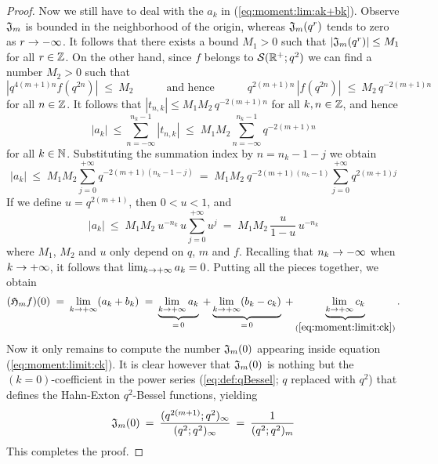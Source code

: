 \begin{proof}
Now we still have to deal with the $a_k$ in (\ref{eq:moment:lim:ak+bk}).
Observe $\mathfrak{J}_{m}$ is bounded in the neighborhood of the origin, whereas
$\mathfrak{J}_{m}(q^r)$ tends to zero as $r \rightarrow -\infty$. It follows
that there exists a bound $M_1>0$ such that $|\mathfrak{J}_{m}(q^r)| \leq M_1$
for all $r \in \mathbb{Z}$. On the other hand, since $f$ belongs to ${\mathcal S}(\mathbb{R}^+;q^2)$
we can find a number $M_2>0$ such that
$$ |q^{4(m+1)n} f(q^{2n})| \; \leq \: M_2
         \hspace{3em} \mbox{and hence} \hspace{3em}
   q^{2(m+1)n} \, |f(q^{2n})| \; \leq \: M_2 \, q^{-2(m+1)n}    $$
for all $n\in \mathbb{Z}$.
It follows that $|t_{n,k}| \leq M_1 M_2\, q^{-2(m+1)n}$ for all $k,n\in \mathbb{Z}$,
and hence
$$ |a_k| \: \leq \sum_{n=-\infty}^{n_k-1} |t_{n,k}|
         \; \leq \; M_1 M_2 \sum_{n=-\infty}^{n_k-1} q^{-2(m+1)n} $$
for all $k\in \mathbb{N}$.
Substituting the summation index by $n=n_k-1-j$ we obtain
$$ |a_k| \: \leq \; M_1 M_2 \sum_{j=0}^{+\infty}  q^{-2(m+1)(n_k-1-j)}
  \:=\;  M_1 M_2\: q^{-2(m+1)(n_k-1)} \sum_{j=0}^{+\infty}  q^{2(m+1)j} $$
If we define $u=q^{2(m+1)}$, then $0<u<1$, and
$$ |a_k| \: \leq \;  M_1 M_2\: u^{-n_k} \,u  \sum_{j=0}^{+\infty} u^j
           \:=\;  M_1 M_2\, \frac{u}{1-u} \, u^{-n_k} $$
where $M_1$, $M_2$ and $u$ only depend on $q$, $m$ and $f$.
Recalling that $n_k \rightarrow -\infty$ when $k \rightarrow +\infty$,
it follows that $\lim_{k \rightarrow +\infty} a_k = 0$.
Putting all the pieces together, we obtain
$$ (\mathfrak{H}_{m}f)(0) \;=\: \lim_{k \rightarrow +\infty} (a_k + b_k)
      \;=\: \underbrace{\lim_{k \rightarrow +\infty} a_k}_{=\,0}
       \: + \underbrace{\lim_{k \rightarrow +\infty} (b_k - c_k)}_{=\,0}
       \: + \underbrace{\lim_{k \rightarrow +\infty} c_k}_{(\ref{eq:moment:limit:ck})}.$$
Now it only remains to compute the number $\mathfrak{J}_{m}(0)$ appearing
inside equation (\ref{eq:moment:limit:ck}). It is clear however
that $\mathfrak{J}_{m}(0)$ is nothing but the $(k=0)$-coefficient in the
power series (\ref{eq:def:qBessel}; $q$ replaced with $q^2$) that
defines the Hahn-Exton $q^2$-Bessel functions, yielding
$$ \mathfrak{J}_{m}(0) \:=\:  \frac{(q^{2(m+1)};q^2)_\infty}{(q^2;q^2)_\infty}
               \:=\:  \frac{1}{(q^2;q^2)_m} $$
This completes the proof.
\end{proof}

